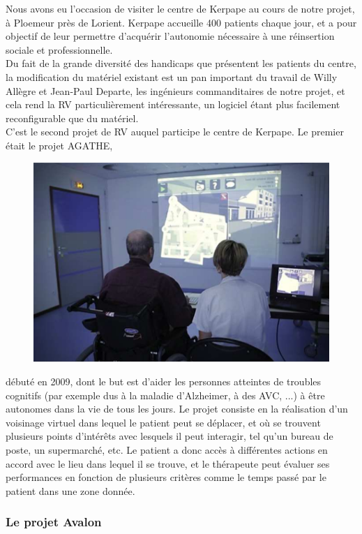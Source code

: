 Nous avons eu l'occasion de visiter le centre de Kerpape au cours de notre projet, à Ploemeur près de Lorient. Kerpape accueille 400 patients chaque jour, et a pour objectif de leur permettre d'acquérir l'autonomie nécessaire à une réinsertion sociale et professionnelle. \\
Du fait de la grande diversité des handicaps que présentent les patients du centre, la modification du matériel existant est un pan important du travail de Willy Allègre et Jean-Paul Departe, les ingénieurs commanditaires de notre projet, et cela rend la RV particulièrement intéressante, un logiciel étant plus facilement reconfigurable que du matériel.\cite{kerpape}\\


C'est le second projet de RV auquel participe le centre de Kerpape. Le premier était le projet AGATHE,
\begin{figure}
	\centering
	\includegraphics[scale=0.7]{1-PreEtude/img/screen_agathe.png}
\end{figure}
 débuté en 2009, dont le but est d'aider les personnes atteintes de troubles cognitifs (par exemple dus à la maladie d'Alzheimer, à des AVC, ...) à être autonomes dans la vie de tous les jours. Le projet consiste en la réalisation d'un \og voisinage virtuel \fg{} dans lequel le patient peut se déplacer, et où se trouvent plusieurs points d'intérêts avec lesquels il peut interagir, tel qu'un bureau de poste, un supermarché, etc. Le patient a donc accès à différentes actions en accord avec le lieu dans lequel il se trouve, et le thérapeute peut évaluer ses performances en fonction de plusieurs critères comme le temps passé par le patient dans une zone donnée.\cite{agathe}

\subsubsection{Le projet Avalon}

